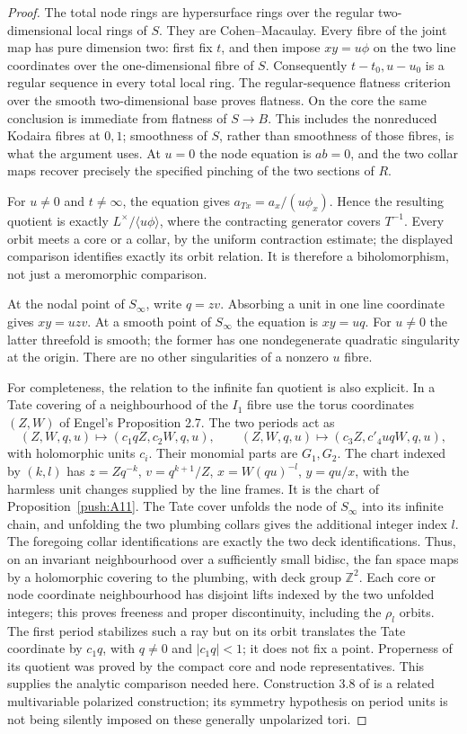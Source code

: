 \begin{proof}
The total node rings are hypersurface rings over the regular
two-dimensional local rings of $S$. They are Cohen--Macaulay.
Every fibre of the joint map has pure dimension two: first fix
$t$, and then impose $xy=u\phi$ on the two line coordinates over
the one-dimensional fibre of $S$. Consequently $t-t_0,u-u_0$ is a
regular sequence in every total local ring. The regular-sequence
flatness criterion over the smooth two-dimensional base proves
flatness. On the core the same conclusion is immediate from
flatness of $S\to B$. This includes the nonreduced Kodaira fibres
at $0,1$; smoothness of $S$, rather than smoothness of those fibres,
is what the argument uses. At $u=0$ the node equation is $ab=0$,
and the two collar maps recover precisely the specified pinching
of the two sections of $R$.

For $u\ne0$ and $t\ne\infty$, the equation gives
$a_{Tx}=a_x/(u\phi_x)$. Hence the resulting quotient is exactly
$L^\times/\langle u\phi\rangle$, where the contracting generator
covers $T^{-1}$. Every orbit meets a core or a collar, by the
uniform contraction estimate; the displayed comparison identifies
exactly its orbit relation. It is therefore a biholomorphism,
not just a meromorphic comparison.

At the nodal point of $S_\infty$, write $q=zv$. Absorbing a unit
in one line coordinate gives $xy=uzv$. At a smooth point of
$S_\infty$ the equation is $xy=uq$. For $u\ne0$ the latter
threefold is smooth; the former has one nondegenerate quadratic
singularity at the origin. There are no other singularities of a
nonzero $u$ fibre.

For completeness, the relation to the infinite fan quotient is
also explicit. In a Tate covering of a neighbourhood of the $I_1$
fibre use the torus coordinates $(Z,W)$ of Engel's Proposition 2.7.
The two periods act as
\[
 (Z,W,q,u)\longmapsto(c_1qZ,c_2W,q,u),\qquad
 (Z,W,q,u)\longmapsto(c_3Z,c'_4uqW,q,u),
\]
with holomorphic units $c_i$. Their monomial parts are $G_1,G_2$.
The chart indexed by $(k,l)$ has
$z=Zq^{-k}$, $v=q^{k+1}/Z$, $x=W(qu)^{-l}$,
$y=qu/x$, with the harmless unit changes supplied by the line
frames. It is the chart of Proposition~\ref{push:A11}.
The Tate cover unfolds the node of $S_\infty$ into its infinite
chain, and unfolding the two plumbing collars gives the additional
integer index $l$. The foregoing collar identifications are exactly
the two deck identifications. Thus, on an invariant neighbourhood
over a sufficiently small bidisc, the fan space maps by a
holomorphic covering to the plumbing, with deck group $\mathbb Z^2$.
Each core or node coordinate neighbourhood has disjoint lifts
indexed by the two unfolded integers; this proves freeness and
proper discontinuity, including the $\rho_l$ orbits. The first
period stabilizes such a ray but on its orbit translates the Tate
coordinate by $c_1q$, with $q\ne0$ and $|c_1q|<1$; it does not
fix a point. Properness of its quotient was proved by the compact
core and node representatives. This supplies the analytic
comparison needed here. Construction 3.8 of \cite{EGFS25} is a
related multivariable polarized construction; its symmetry
hypothesis on period units is not being silently imposed on these
generally unpolarized tori.


\end{proof}
